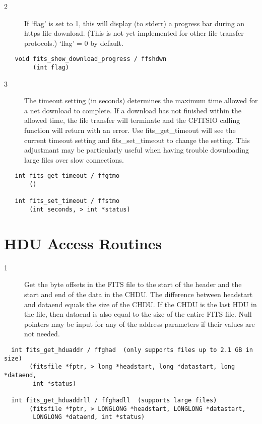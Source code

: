 \documentclass[11pt]{book}
\begin{document}
\begin{description}
\item[2] If `flag' is set to 1, this will display (to stderr) a progress 
  bar during an https file download.  (This is not yet implemented
  for other file transfer protocols.)  `flag' = 0 by default.
 \label{ffshdwn}
\end{description}

\begin{verbatim}
   void fits_show_download_progress / ffshdwn
        (int flag)
\end{verbatim}

\begin{description}
\item[3] The timeout setting (in seconds) determines the maximum time
  allowed for a net download to complete.  If a download has not finished within
  the allowed time, the file transfer will terminate and the CFITSIO calling
  function will return with an error.  Use fits\_get\_timeout will see the 
  current timeout setting and fits\_set\_timeout to change the setting.  This
  adjustmant may be particularly useful when having trouble downloading large 
  files over slow connections.
 \label{ffgtmo}
\end{description}

\begin{verbatim}
   int fits_get_timeout / ffgtmo
       ()
       
   int fits_set_timeout / ffstmo
       (int seconds, > int *status)
\end{verbatim}

\section{HDU Access Routines}


\begin{description}
\item[1 ] Get the byte offsets in the FITS file to the start of the header
    and the start and end of the data in the CHDU. The difference
    between headstart and dataend equals the size of the CHDU.  If the
    CHDU is the last HDU in the file, then dataend is also equal to the
    size of the entire FITS file.  Null pointers may be input for any
   of the address parameters if their values are not needed. \label{ffghad}
\end{description}

\begin{verbatim}
  int fits_get_hduaddr / ffghad  (only supports files up to 2.1 GB in size)
       (fitsfile *fptr, > long *headstart, long *datastart, long *dataend,
        int *status)

  int fits_get_hduaddrll / ffghadll  (supports large files)
       (fitsfile *fptr, > LONGLONG *headstart, LONGLONG *datastart,
        LONGLONG *dataend, int *status)
\end{verbatim}
\end{document}
